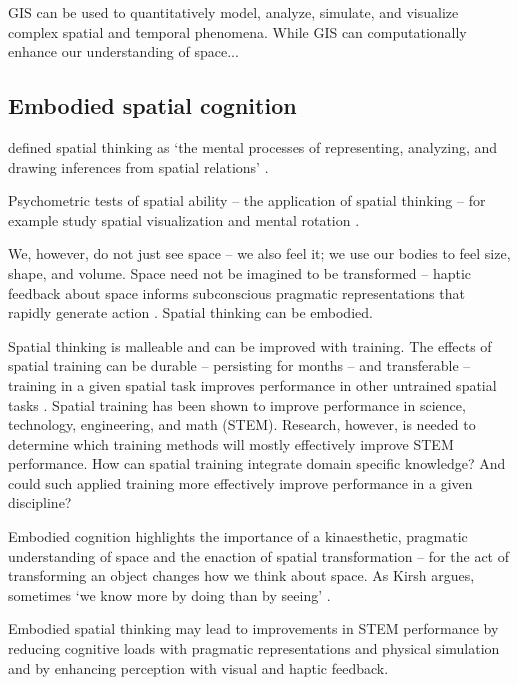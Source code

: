 GIS can be used to quantitatively model, analyze, simulate, and visualize 
complex spatial and temporal phenomena. %
%
While GIS can computationally enhance our understanding of space...



\subsection{Embodied spatial cognition}



\citeauthor{Uttal2013} defined spatial thinking as 
`the mental processes of representing, analyzing, and drawing inferences from spatial relations' \citeyearpar{Uttal2013}. 


Psychometric tests of spatial ability -- the application of spatial thinking -- for example study spatial visualization and mental rotation \citep{Uttal2013,Uttal2013a,Ormand2014}.

We, however, do not just see space -- we also feel it; we use our bodies to feel size, shape, and volume. 
Space need not be imagined to be transformed -- haptic feedback about space informs subconscious pragmatic representations that rapidly generate action \citep{Jeannerod1997}. Spatial thinking can be embodied.

Spatial thinking is malleable and can be improved with training. 
The effects of spatial training can be durable -- persisting for months -- and transferable -- training in a given spatial task improves performance in other untrained spatial tasks \citep{Uttal2013}. 
Spatial training has been shown to improve performance in science, technology, engineering, and math (STEM). 
Research, however, is needed to determine which training methods will mostly effectively improve STEM performance. 
How can spatial training integrate domain specific knowledge? And could such applied training more effectively improve performance in a given discipline? \citep{Uttal2013} 


Embodied cognition highlights the importance of a kinaesthetic, pragmatic understanding of space
and the enaction of spatial transformation -- for the act of transforming an object changes how we think about space. 
As Kirsh argues, sometimes `we know more by doing than by seeing' \citeyearpar{Kirsh2013}.

Embodied spatial thinking may lead to improvements in STEM performance by reducing cognitive loads with pragmatic representations and physical simulation and by enhancing perception with visual and haptic feedback. 

